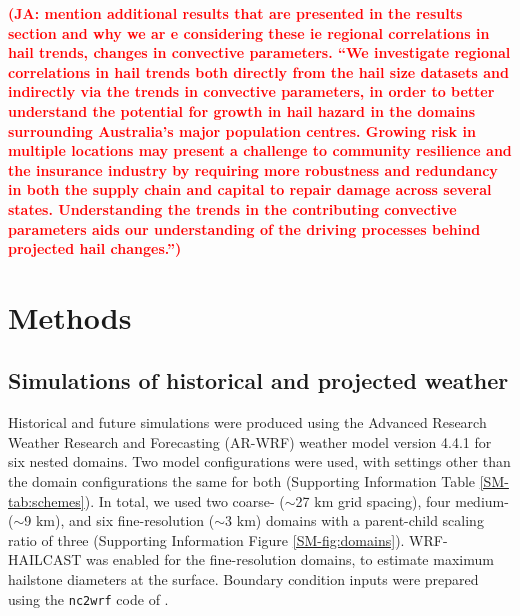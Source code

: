 \documentclass[]{agujournal2019}\usepackage[]{graphicx}\usepackage[]{xcolor}
\newcommand*{\todo}[1]{\textbf{\textcolor{red}{(#1)}}}
\begin{document}
\todo{JA: mention additional results that are presented in the results section
and why we ar e considering these ie regional correlations in hail trends,
changes in convective parameters. ``We investigate regional correlations in hail
trends both directly from the hail size datasets and indirectly via the trends
in convective parameters, in order to better understand the potential for growth
in hail hazard in the domains surrounding Australia’s major population centres.
Growing risk in multiple locations may present a challenge to community
resilience and the insurance industry by requiring more robustness and
redundancy in both the supply chain and capital to repair damage across several
states. Understanding the trends in the contributing convective parameters aids
our understanding of the driving processes behind projected hail changes.''}

\section{Methods}

\subsection{Simulations of historical and projected weather}

Historical and future simulations were produced using the Advanced Research
Weather Research and Forecasting (AR-WRF) weather model version 4.4.1
\cite{Skamarock_2021} for six nested domains. Two model configurations were
used, with settings other than the domain configurations the same for both
(Supporting Information Table \ref{SM-tab:schemes}). In total, we used two
coarse- ($\sim$27 km grid spacing), four medium- ($\sim$9 km), and six
fine-resolution ($\sim$3 km) domains with a parent-child scaling ratio of three
(Supporting Information Figure \ref{SM-fig:domains}). WRF-HAILCAST
\cite{Adams-Selin_WF_2019} was enabled for the fine-resolution domains, to
estimate maximum hailstone diameters at the surface. Boundary condition inputs
were prepared using the \texttt{nc2wrf} code of . 
\end{document}
